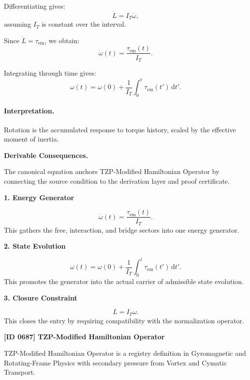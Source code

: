 Differentiating gives:
\begin{equation}
\dot{L}
=
I_T\dot{\omega},
\end{equation}
assuming $I_T$ is constant over the interval.

Since $\dot{L}=\tau_{\mathrm{em}}$, we obtain:
\begin{equation}
\dot{\omega}(t)
=
\frac{\tau_{\mathrm{em}}(t)}{I_T}.
\end{equation}

Integrating through time gives:
\begin{equation}
\boxed{
\omega(t)
=
\omega(0)
+
\frac{1}{I_T}
\int_0^t
\tau_{\mathrm{em}}(t')
\,\mathrm{d}t' .
}
\end{equation}

\paragraph{Interpretation.}
Rotation is the accumulated response to torque history, scaled by the effective moment of inertia.

\par\vspace{0.35em}
\noindent\textbf{Derivable Consequences.}\quad
\begingroup
\footnotesize
\raggedright
The canonical equation anchors TZP-Modified Hamiltonian Operator by connecting the source condition to the derivation layer and proof certificate.
\par\endgroup

\noindent\textbf{1. Energy Generator}\par
\[
\dot{\omega}(t) = \frac{\tau_{\mathrm{em}}(t)}{I_T}.
\]
\noindent This gathers the free, interaction, and bridge sectors into one energy generator.\par
\noindent\textbf{2. State Evolution}\par
\[
\omega(t) = \omega(0) + \frac{1}{I_T} \int_0^t \tau_{\mathrm{em}}(t') \,\mathrm{d}t'.
\]
\noindent This promotes the generator into the actual carrier of admissible state evolution.\par
\noindent\textbf{3. Closure Constraint}\par
\[
L=I_T\omega.
\]
\noindent This closes the entry by requiring compatibility with the normalization operator.\par

\clearpage
\noindent\textbf{[ID 0687] TZP-Modified Hamiltonian Operator}\par
\vspace{0.35em}
\begingroup\small
{}
TZP-Modified Hamiltonian Operator is a registry definition in Gyromagnetic and Rotating-Frame Physics with secondary pressure from Vortex and Cymatic Transport.

